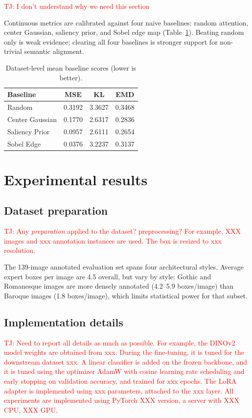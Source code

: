 \documentclass[lineno,pdflatex,sn-mathphys-num]{sn-jnl}%
\theoremstyle{thmstyleone}%
\theoremstyle{thmstyletwo}%
\theoremstyle{thmstylethree}%
\begin{document}
\textcolor{red}{TJ: I don't understand why we need this section}

Continuous metrics are calibrated against four naive baselines: random
attention, center Gaussian, saliency prior, and Sobel edge map
(Table~\ref{tab:baselines}). Beating random only is weak evidence; clearing
all four baselines is stronger support for non-trivial semantic alignment.

\begin{table}[h]
\centering
\caption{Dataset-level mean baseline scores (lower is better).}
\label{tab:baselines}
\begin{tabular}{lccc}
\toprule
Baseline & MSE & KL & EMD \\
\midrule
Random         & 0.3192 & 3.3627 & 0.3468 \\
Center Gaussian & 0.1770 & 2.6317 & 0.2836 \\
Saliency Prior & 0.0957 & 2.6111 & 0.2654 \\
Sobel Edge     & 0.0376 & 3.2237 & 0.3137 \\
\bottomrule
\end{tabular}%
\end{table}


\section{Experimental results} \label{section results}

\subsection{Dataset preparation}

\textcolor{red}{TJ: Any \textit{preparation} applied to the dataset? preprocessing? For example, XXX images and xxx annotation instances are used. The box is resized to xxx resolution. }

The 139-image annotated evaluation set spans four architectural styles. Average expert boxes per image are 4.5 overall, but vary by style: Gothic and Romanesque images are more densely annotated (4.2--5.9 boxes/image) than Baroque images (1.8 boxes/image), which limits statistical power for that
subset.

\subsection{Implementation details}

\textcolor{red}{TJ: Need to report all details as much as possible. For example, the DINOv2 model weights are obtained from xxx. During the fine-tuning, it is tuned for the downstream dataset xxx. A linear classifier is added on the frozen backbone, and it is tuned using the optimizer AdamW with cosine learning rate scheduling and early stopping on validation accuracy, and trained for xxx epochs. The LoRA adapter is implemented using xxx parameters, attached to the xxx layer. All experiments are implemented using PyTorch XXX version, a server with XXX CPU, XXX GPU. }
\end{document}
